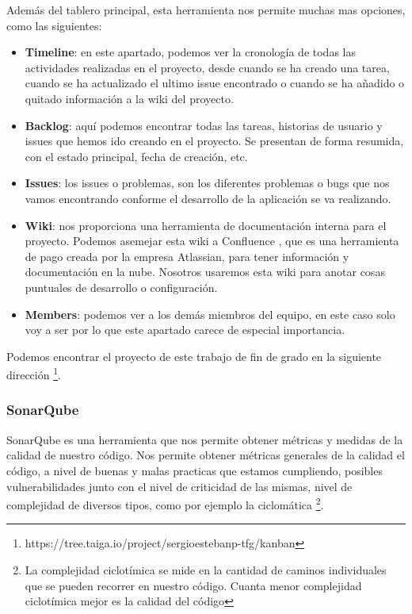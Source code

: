 Además del tablero principal, esta herramienta nos permite muchas mas opciones, como las siguientes: 
\begin{itemize}
    \item \textbf{Timeline}: en este apartado, podemos ver la cronología de todas las actividades realizadas en el proyecto, desde cuando se ha creado una tarea, cuando se ha actualizado el ultimo issue encontrado o cuando se ha añadido o quitado información a la wiki del proyecto. 
    \item \textbf{Backlog}: aquí podemos encontrar todas las tareas, historias de usuario y issues que hemos ido creando en el proyecto. Se presentan de forma resumida, con el estado principal, fecha de creación, etc. 
    \item \textbf{Issues}: los issues o problemas, son los diferentes problemas o bugs que nos vamos encontrando conforme el desarrollo de la aplicación se va realizando. 
    \item \textbf{Wiki}: nos proporciona una herramienta de documentación interna para el proyecto. Podemos asemejar esta wiki a Confluence \cite{confluence}, que es una herramienta de pago creada por la empresa Atlassian, para tener información y documentación en la nube. Nosotros usaremos esta wiki para anotar cosas puntuales de desarrollo o configuración. 
    \item \textbf{Members}: podemos ver a los demás miembros del equipo, en este caso solo voy a ser por lo que este apartado carece de especial importancia. 
\end{itemize}

Podemos encontrar el proyecto de este trabajo de fin de grado en la siguiente dirección \footnote{https://tree.taiga.io/project/sergioestebanp-tfg/kanban}. 

\subsubsection{SonarQube}
SonarQube \cite{sonarqube} es una herramienta que nos permite obtener métricas y medidas de la calidad de nuestro código. Nos permite obtener métricas generales de la calidad el código, a nivel de buenas y malas practicas que estamos cumpliendo, posibles vulnerabilidades junto con el nivel de criticidad de las mismas, nivel de complejidad de diversos tipos, como por ejemplo la ciclomática \footnote{La complejidad ciclotímica se mide en la cantidad de caminos individuales que se pueden recorrer en nuestro código. Cuanta menor complejidad ciclotímica mejor es la calidad del código}.

